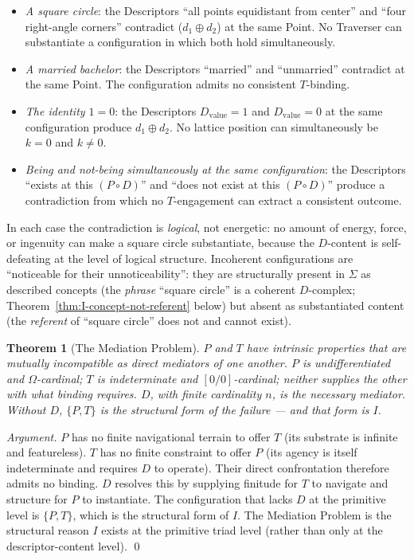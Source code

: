 \documentclass[11pt,a4paper]{article}
\newtheorem{theorem}{Theorem}[section]
\theoremstyle{definition}
\theoremstyle{remark}
\begin{document}
\begin{itemize}[leftmargin=*]
\item \emph{A square circle}: the Descriptors ``all points equidistant from center'' and ``four right-angle corners'' contradict ($d_{1} \oplus d_{2}$) at the same Point. No Traverser can substantiate a configuration in which both hold simultaneously.
\item \emph{A married bachelor}: the Descriptors ``married'' and ``unmarried'' contradict at the same Point. The configuration admits no consistent $T$-binding.
\item \emph{The identity $1 = 0$}: the Descriptors $D_{\mathrm{value}} = 1$ and $D_{\mathrm{value}} = 0$ at the same configuration produce $d_{1} \oplus d_{2}$. No lattice position can simultaneously be $k = 0$ and $k \neq 0$.
\item \emph{Being and not-being simultaneously at the same configuration}: the Descriptors ``exists at this $(P \circ D)$'' and ``does not exist at this $(P \circ D)$'' produce a contradiction from which no $T$-engagement can extract a consistent outcome.
\end{itemize}

In each case the contradiction is \emph{logical}, not energetic: no amount of energy, force, or ingenuity can make a square circle substantiate, because the $D$-content is self-defeating at the level of logical structure. Incoherent configurations are ``noticeable for their unnoticeability'': they are structurally present in $\Sigma$ as described concepts (the \emph{phrase} ``square circle'' is a coherent $D$-complex; Theorem~\ref{thm:I-concept-not-referent} below) but absent as substantiated content (the \emph{referent} of ``square circle'' does not and cannot exist).

\begin{theorem}[The Mediation Problem]\label{thm:mediation-problem}
$P$ and $T$ have intrinsic properties that are mutually incompatible as direct mediators of one another. $P$ is undifferentiated and $\Omega$-cardinal; $T$ is indeterminate and $[0/0]$-cardinal; neither supplies the other with what binding requires. $D$, with finite cardinality $n$, is the necessary mediator. Without $D$, $\{P,T\}$ is the structural form of the failure --- and that form is $I$.
\end{theorem}

\begin{proof}[Argument]
$P$ has no finite navigational terrain to offer $T$ (its substrate is infinite and featureless). $T$ has no finite constraint to offer $P$ (its agency is itself indeterminate and requires $D$ to operate). Their direct confrontation therefore admits no binding. $D$ resolves this by supplying finitude for $T$ to navigate and structure for $P$ to instantiate. The configuration that lacks $D$ at the primitive level is $\{P,T\}$, which is the structural form of $I$. The Mediation Problem is the structural reason $I$ exists at the primitive triad level (rather than only at the descriptor-content level). \qed
\end{proof}
\end{document}

